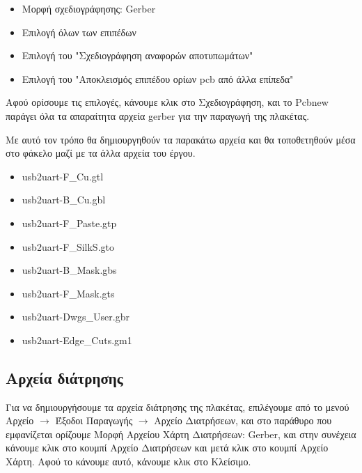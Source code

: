 \documentclass[a4paper]{article}
\begin{document}
\begin{itemize}
    \item Μορφή σχεδιογράφησης: Gerber
    \item Επιλογή όλων των επιπέδων
    \item Επιλογή του "Σχεδιογράφηση αναφορών αποτυπωμάτων"
    \item Επιλογή του "Αποκλεισμός επιπέδου ορίων pcb από άλλα επίπεδα"
\end{itemize}

\begin{figure}
  \begin{center}
    \label{fig:kicad-main}
  \end{center}
\end{figure}

Αφού ορίσουμε τις επιλογές, κάνουμε κλικ στο Σχεδιογράφηση, και το \textenglish{Pcbnew} παράγει όλα τα απαραίτητα αρχεία gerber για την παραγωγή της πλακέτας.

Με αυτό τον τρόπο θα δημιουργηθούν τα παρακάτω αρχεία και θα τοποθετηθούν μέσα στο φάκελο μαζί με τα άλλα αρχεία του έργου.

\begin{itemize}
    \item usb2uart-F\_Cu.gtl
    \item usb2uart-B\_Cu.gbl
    \item usb2uart-F\_Paste.gtp
    \item usb2uart-F\_SilkS.gto
    \item usb2uart-B\_Mask.gbs
    \item usb2uart-F\_Mask.gts
    \item usb2uart-Dwgs\_User.gbr
    \item usb2uart-Edge\_Cuts.gm1
\end{itemize}

\subsection{Αρχεία διάτρησης}
Για να δημιουργήσουμε τα αρχεία διάτρησης της πλακέτας, επιλέγουμε από το μενού Αρχείο $\rightarrow$ Έξοδοι Παραγωγής $\rightarrow$ Αρχείο Διατρήσεων, και στο παράθυρο που εμφανίζεται ορίζουμε Μορφή Αρχείου Χάρτη Διατρήσεων: Gerber, και στην συνέχεια κάνουμε κλικ στο κουμπί Αρχείο Διατρήσεων και μετά κλικ στο κουμπί Αρχείο Χάρτη. Αφού το κάνουμε αυτό, κάνουμε κλικ στο Κλείσιμο.
\end{document}
